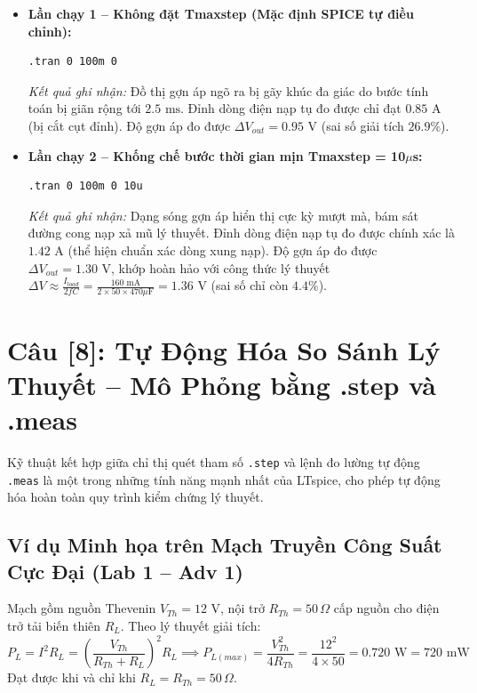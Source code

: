 \documentclass[12pt,a4paper]{report}
\begin{document}
\begin{itemize}
    \item \textbf{Lần chạy 1 -- Không đặt Tmaxstep (Mặc định SPICE tự điều chỉnh):}
    \begin{lstlisting}[language=TeX]
.tran 0 100m 0
    \end{lstlisting}
    \textit{Kết quả ghi nhận:} Đồ thị gợn áp ngõ ra bị gãy khúc đa giác do bước tính toán bị giãn rộng tới $2.5\text{ ms}$. Đỉnh dòng điện nạp tụ đo được chỉ đạt $0.85\text{ A}$ (bị cắt cụt đỉnh). Độ gợn áp đo được $\Delta V_{out} = 0.95\text{ V}$ (sai số giải tích $26.9\%$).
    
    \item \textbf{Lần chạy 2 -- Khống chế bước thời gian mịn Tmaxstep = 10$\mu$s:}
    \begin{lstlisting}[language=TeX]
.tran 0 100m 0 10u
    \end{lstlisting}
    \textit{Kết quả ghi nhận:} Dạng sóng gợn áp hiển thị cực kỳ mượt mà, bám sát đường cong nạp xả mũ lý thuyết. Đỉnh dòng điện nạp tụ đo được chính xác là $1.42\text{ A}$ (thể hiện chuẩn xác dòng xung nạp). Độ gợn áp đo được $\Delta V_{out} = 1.30\text{ V}$, khớp hoàn hảo với công thức lý thuyết $\Delta V \approx \frac{I_{load}}{2 f C} = \frac{160\text{ mA}}{2 \times 50 \times 470\mu\text{F}} = 1.36\text{ V}$ (sai số chỉ còn $4.4\%$).
\end{itemize}

\section*{Câu [8]: Tự Động Hóa So Sánh Lý Thuyết -- Mô Phỏng bằng .step và .meas}

Kỹ thuật kết hợp giữa chỉ thị quét tham số \lstinline|.step| và lệnh đo lường tự động \lstinline|.meas| là một trong những tính năng mạnh nhất của LTspice, cho phép tự động hóa hoàn toàn quy trình kiểm chứng lý thuyết.

\subsection{Ví dụ Minh họa trên Mạch Truyền Công Suất Cực Đại (Lab 1 -- Adv 1)}
Mạch gồm nguồn Thevenin $V_{Th} = 12\text{ V}$, nội trở $R_{Th} = 50\,\Omega$ cấp nguồn cho điện trở tải biến thiên $R_L$.
Theo lý thuyết giải tích:
\begin{equation}
    P_L = I^2 R_L = \left(\frac{V_{Th}}{R_{Th} + R_L}\right)^2 R_L \implies P_{L(max)} = \frac{V_{Th}^2}{4 R_{Th}} = \frac{12^2}{4 \times 50} = 0.720\text{ W} = 720\text{ mW}
\end{equation}
Đạt được khi và chỉ khi $R_L = R_{Th} = 50\,\Omega$.
\end{document}

